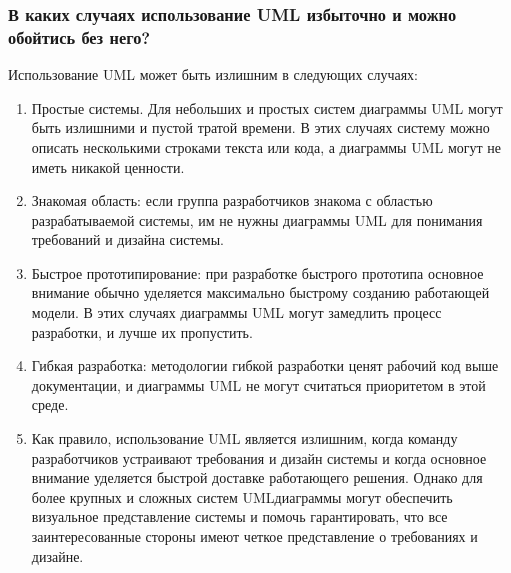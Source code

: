 \documentclass[letterpaper,10pt,russian]{sphinxmanual}
\begin{document}
\subsubsection{В каких случаях использование UML избыточно и можно обойтись без него?}
\label{\detokenize{educational_materials/uml/content:id4}}
\sphinxAtStartPar
Использование UML может быть излишним в следующих случаях:
\begin{enumerate}
%
\item {} 
\sphinxAtStartPar
Простые системы. Для небольших и простых систем диаграммы UML могут быть излишними и пустой тратой времени. В этих случаях систему можно описать несколькими строками текста или кода, а диаграммы UML могут не иметь никакой ценности.

\item {} 
\sphinxAtStartPar
Знакомая область: если группа разработчиков знакома с областью разрабатываемой системы, им не нужны диаграммы UML для понимания требований и дизайна системы.

\item {} 
\sphinxAtStartPar
Быстрое прототипирование: при разработке быстрого прототипа основное внимание обычно уделяется максимально быстрому созданию работающей модели. В этих случаях диаграммы UML могут замедлить процесс разработки, и лучше их пропустить.

\item {} 
\sphinxAtStartPar
Гибкая разработка: методологии гибкой разработки ценят рабочий код выше документации, и диаграммы UML не могут считаться приоритетом в этой среде.

\item {} 
\sphinxAtStartPar
Как правило, использование UML является излишним, когда команду разработчиков устраивают требования и дизайн системы и когда основное внимание уделяется быстрой доставке работающего решения. Однако для более крупных и сложных систем UML\sphinxhyphen{}диаграммы могут обеспечить визуальное представление системы и помочь гарантировать, что все заинтересованные стороны имеют четкое представление о требованиях и дизайне.

\end{enumerate}
\end{document}
